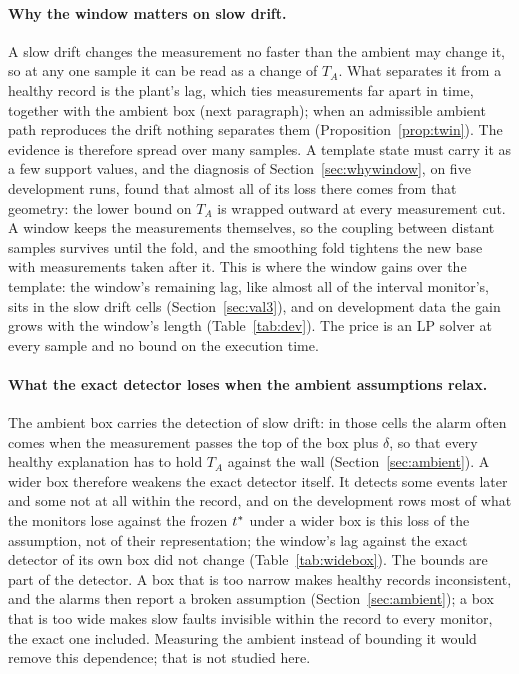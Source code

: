 \paragraph{Why the window matters on slow drift.} A slow drift changes the measurement no faster than the ambient may
change it, so at any one sample it can be read as a change of $T_A$. What separates it from a healthy record is the
plant's lag, which ties measurements far apart in time, together with the ambient box (next paragraph); when an
admissible ambient path reproduces the drift nothing separates them (Proposition~\ref{prop:twin}). The evidence is therefore spread over many samples. A template
state must carry it as a few support values, and the diagnosis of Section~\ref{sec:whywindow}, on five development runs, found that
almost all of its loss there comes from that geometry: the lower bound on $T_A$ is wrapped outward at every measurement cut. A window
keeps the measurements themselves, so the coupling between distant samples survives until the fold, and the
smoothing fold tightens the new base with measurements taken after it. This is where the window gains over the
template: the window's remaining lag, like almost all of the interval monitor's, sits in the slow drift cells
(Section~\ref{sec:val3}), and on development data the
gain grows with the window's length (Table~\ref{tab:dev}). The price is an LP solver at every sample and no bound on
the execution time.

\paragraph{What the exact detector loses when the ambient assumptions relax.} The ambient box carries the detection
of slow drift: in those cells the alarm often comes when the measurement passes the top of the box plus $\delta$, so
that every healthy explanation has to hold $T_A$ against the wall (Section~\ref{sec:ambient}). A wider box therefore
weakens the exact detector itself. It detects some events later and some not at all within the record, and on the development rows most of what the monitors lose against the frozen $t^{\ast}$ under a wider box is this
loss of the assumption, not of their
representation; the window's lag against the exact detector of its own box did not change
(Table~\ref{tab:widebox}). The bounds are part of the detector. A box that is too narrow makes healthy records
inconsistent, and the alarms then report a broken assumption (Section~\ref{sec:ambient}); a box that is too wide makes slow faults invisible within the record to every monitor, the exact one included. Measuring the ambient instead of bounding it
would remove this dependence; that is not studied here.

